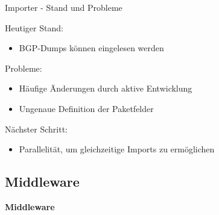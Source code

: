 \documentclass[9pt]{beamer}
\begin{document}
\begin{frame}{Importer - Stand und Probleme}{}

	Heutiger Stand:
	\begin{itemize}
		\item BGP-Dumps können eingelesen werden
	\end{itemize}
	\vspace{0,2cm}
	Probleme:
	\begin{itemize}
		\item  Häufige Änderungen durch aktive Entwicklung
		\item Ungenaue Definition der Paketfelder
	\end{itemize}
	\vspace{0,2cm}
	Nächster Schritt:
	\begin{itemize}
		\item Parallelität, um gleichzeitige Imports zu ermöglichen
	\end{itemize}

\end{frame}

\subsection{Middleware}

	\begin{frame}{}
		\begin{center}
			\LARGE \textbf{Middleware}
		\end{center}
	\end{frame}
\end{document}
